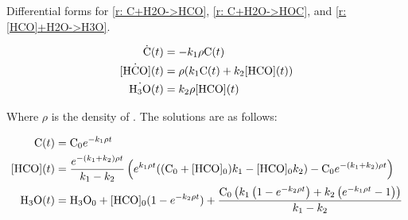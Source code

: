 \section{} \label{sec: C+H2O eqs}

Differential forms for \ref{r: C+H2O->HCO}, \ref{r: C+H2O->HOC}, and \ref{r: [HCO]+H2O->H3O}.

\begin{align}
	\dot{\ce{C}}(t) & = -k_1 \rho \ce{C}(t) \\
	\dot{\ce{[HCO]}}(t) & = \rho(k_1 \ce{C}(t) + k_2 \ce{[HCO]}(t)) \\
	\dot{\ce{H3O}}(t) & = k_2 \rho \ce{[HCO]}(t)
\end{align}

Where $\rho$ is the density of . The solutions are as follows:

\begin{align}
	\ce{C}(t) & = \ce{C0} e^{-k_1 \rho t} \\
	\ce{[HCO]}(t) & = \frac{e^{-(k_1 + k_2) \rho t}}{k_1 - k_2} \left(e^{k_1 \rho t}((\ce{C0} + \ce{[HCO]0})k_1 - \ce{[HCO]0} k_2) - \ce{C0} e^{-(k_1 + k_2) \rho t}\right) \\
	\ce{H3O}(t) & = \ce{H3O0} + \ce{[HCO]0} (1 - e^{-k_2 \rho t}) + \frac{\ce{C0}\left( k_1 \left(1 - e^{-k_2 \rho t}\right) + k_2 \left(e^{-k_1 \rho t} - 1\right) \right)}{k_1 - k_2}
\end{align}